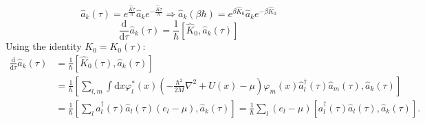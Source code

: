 \documentclass[11pt, a4paper]{article}
\newcommand{\dd}{\mathrm{d}}
\begin{document}
\begin{enumerate}
    \begin{equation*}
        \hat a_k(\tau) = e^{\frac{\hat K\tau}{\hbar}}\hat a_k e^{-\frac{\hat K\tau}{\hbar}}
        \Longrightarrow
        \hat a_k(\beta\hbar) = e^{\beta \hat K_0}\hat a_ke^{-\beta \hat K_0}
    \end{equation*}
    \begin{equation*}
        \frac{\dd}{\dd\tau}\hat a_k(\tau) = \frac{1}{\hbar}[\hat K_0, \hat a_k(\tau)]
    \end{equation*}
    Using the identity $K_0 = K_0(\tau)$:
    \begin{align*}
        \frac{\dd}{\dd\tau}\hat a_k(\tau) &= \frac{1}{\hbar}[\hat K_0(\tau), \hat a_k(\tau)]\\
        & = \frac{1}{\hbar}\left[\sum\limits_{l,m}\int\dd x \varphi^*_l(x) \left(-\frac{\hbar^2}{2M}\nabla^2 + U(x) - \mu\right)
        \varphi_m(x)\hat a_l^{\dagger}(\tau)\hat a_m(\tau), \hat a_k(\tau) \right] \\
        & = \frac{1}{\hbar}\left[\sum\limits_{l}a_l^{\dagger}(\tau)\hat a_l(\tau) (e_l - \mu), \hat a_k(\tau)\right]
        = \frac{1}{\hbar}\sum\limits_{l}(e_l - \mu) \left[a_l^{\dagger}(\tau)\hat a_l(\tau), \hat a_k(\tau)\right].
    \end{align*}
    

\end{enumerate}
\end{document}
